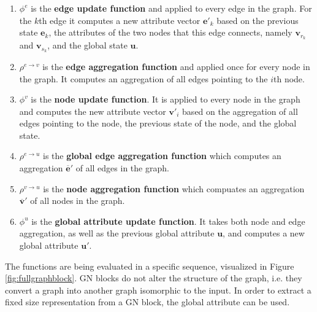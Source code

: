 \begin{enumerate}
    \item $\phi^e$ is the \textbf{edge update function} and applied to every edge in the graph. For the $k$th edge it computes a new attribute vector $\bm{e}'_k$ based on the previous state $\bm{e}_k$, the attributes of the two nodes that this edge connects, namely $\bm{v}_{r_k}$ and $\bm{v}_{s_k}$, and the global state $\bm{u}$.
    \item $\rho^{e\rightarrow v}$ is the \textbf{edge aggregation function} and applied once for every node in the graph. It computes an aggregation of all edges pointing to the $i$th node.
    \item $\phi^v$ is the \textbf{node update function}. It is applied to every node in the graph and computes the new attribute vector $\bm{v}'_i$ based on the aggregation of all edges pointing to the node, the previous state of the node, and the global state.
    \item $\rho^{e\rightarrow u}$ is the \textbf{global edge aggregation function} which computes an aggregation $\bm{\overline{e}}'$ of all edges in the graph.
    \item $\rho^{v\rightarrow u}$ is the \textbf{node aggregation function} which compuates an aggregation $\bm{\overline{v}}'$ of all nodes in the graph.
    \item $\phi^u$ is the \textbf{global attribute update function}. It takes both node and edge aggregation, as well as the previous global attribute $\bm{u}$, and computes a new global attribute $\bm{u}'$.
\end{enumerate}

The functions are being evaluated in a specific sequence, visualized in Figure \ref{fig:fullgraphblock}. GN blocks do not alter the structure of the graph, i.e. they convert a graph into another graph isomorphic to the input. In order to extract a fixed size representation from a GN block, the global attribute can be used.

